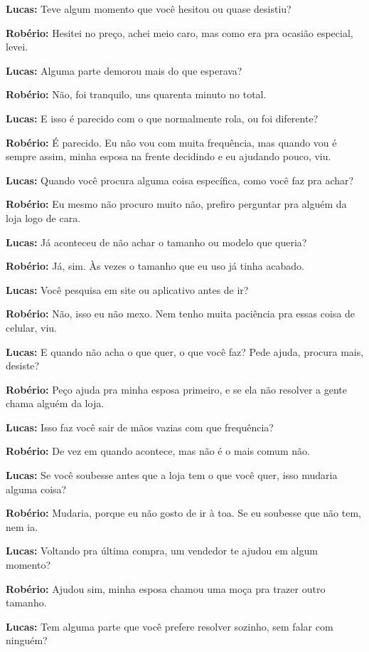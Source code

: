 \textbf{Lucas:} Teve algum momento que você hesitou ou quase desistiu?

\textbf{Robério:} Hesitei no preço, achei meio caro, mas como era pra ocasião especial, levei.

\textbf{Lucas:} Alguma parte demorou mais do que esperava?

\textbf{Robério:} Não, foi tranquilo, uns quarenta minuto no total.

\textbf{Lucas:} E isso é parecido com o que normalmente rola, ou foi diferente?

\textbf{Robério:} É parecido. Eu não vou com muita frequência, mas quando vou é sempre assim, minha esposa na frente decidindo e eu ajudando pouco, viu.

\textbf{Lucas:} Quando você procura alguma coisa específica, como você faz pra achar?

\textbf{Robério:} Eu mesmo não procuro muito não, prefiro perguntar pra alguém da loja logo de cara.

\textbf{Lucas:} Já aconteceu de não achar o tamanho ou modelo que queria?

\textbf{Robério:} Já, sim. Às vezes o tamanho que eu uso já tinha acabado.

\textbf{Lucas:} Você pesquisa em site ou aplicativo antes de ir?

\textbf{Robério:} Não, isso eu não mexo. Nem tenho muita paciência pra essas coisa de celular, viu.

\textbf{Lucas:} E quando não acha o que quer, o que você faz? Pede ajuda, procura mais, desiste?

\textbf{Robério:} Peço ajuda pra minha esposa primeiro, e se ela não resolver a gente chama alguém da loja.

\textbf{Lucas:} Isso faz você sair de mãos vazias com que frequência?

\textbf{Robério:} De vez em quando acontece, mas não é o mais comum não.

\textbf{Lucas:} Se você soubesse antes que a loja tem o que você quer, isso mudaria alguma coisa?

\textbf{Robério:} Mudaria, porque eu não gosto de ir à toa. Se eu soubesse que não tem, nem ia.

\textbf{Lucas:} Voltando pra última compra, um vendedor te ajudou em algum momento?

\textbf{Robério:} Ajudou sim, minha esposa chamou uma moça pra trazer outro tamanho.

\textbf{Lucas:} Tem alguma parte que você prefere resolver sozinho, sem falar com ninguém?

